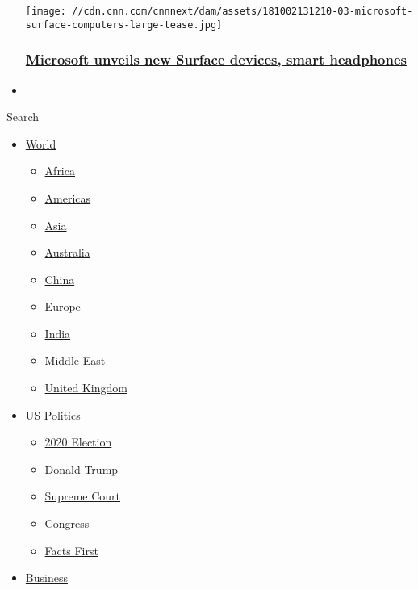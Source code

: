\begin{itemize}
  \texttt{[image: //cdn.cnn.com/cnnnext/dam/assets/181002131210-03-microsoft-surface-computers-large-tease.jpg]}

  \hypertarget{microsoft-unveils-new-surface-devices-smart-headphones}{%
  \subsubsection{\texorpdfstring{\href{/2018/10/02/tech/microsoft-surface-computers/index.html}{Microsoft
  unveils new Surface devices, smart
  headphones}}{Microsoft unveils new Surface devices, smart headphones}}\label{microsoft-unveils-new-surface-devices-smart-headphones}}
\item
\end{itemize}

Search

\begin{itemize}
\tightlist
\item
  \href{/world}{World}

  \begin{itemize}
  \tightlist
  \item
    \href{/africa}{Africa}
  \item
    \href{/americas}{Americas}
  \item
    \href{/asia}{Asia}
  \item
    \href{/australia}{Australia}
  \item
    \href{/china}{China}
  \item
    \href{/europe}{Europe}
  \item
    \href{/india}{India}
  \item
    \href{/middle-east}{Middle East}
  \item
    \href{/uk}{United Kingdom}
  \end{itemize}
\item
  \href{/politics}{US Politics}

  \begin{itemize}
  \tightlist
  \item
    \href{/election/2020}{2020 Election}
  \item
    \href{/specials/politics/president-donald-trump-45}{Donald Trump}
  \item
    \href{/specials/politics/supreme-court-nine}{Supreme Court}
  \item
    \href{/specials/politics/congress}{Congress}
  \item
    \href{/specials/politics/fact-check-politics}{Facts First}
  \end{itemize}
\item
  \href{/business}{Business}


\end{itemize}

